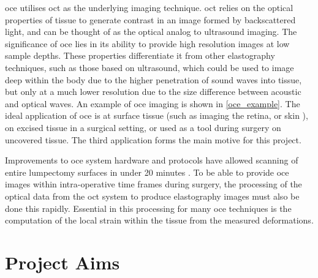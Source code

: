 \ac{oce} utilises \ac{oct} as the underlying imaging technique. \ac{oct} relies on the optical properties of tissue to generate contrast in an image formed by backscattered light, and can be thought of as the optical analog to ultrasound imaging. The significance of \ac{oce} lies in its ability to provide high resolution images at low sample depths. These properties differentiate it from other elastography techniques, such as those based on ultrasound, which could be used to image deep within the body due to the higher penetration of sound waves into tissue, but only at a much lower resolution due to the size difference between acoustic and optical waves. An example of \ac{oce} imaging is shown in \autoref{oce_example}. The ideal application of \ac{oce} is at surface tissue (such as imaging the retina, or skin \cite{kennedy_review_2014}), on excised tissue in a surgical setting, or used as a tool during surgery on uncovered tissue. The third application forms the main motive for this project.

Improvements to \ac{oce} system hardware and protocols have allowed scanning of entire lumpectomy surfaces in under 20 minutes \cite{allen_wide-field_2016}. To be able to provide \ac{oce} images within intra-operative time frames during surgery, the processing of the optical data from the \ac{oct} system to produce elastography images must also be done this rapidly. Essential in this processing for many \ac{oce} techniques is the computation of the local strain within the tissue from the measured deformations. 

\section{Project Aims}\label{aims}

